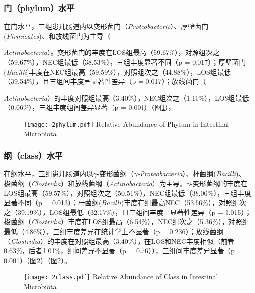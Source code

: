     \subsubsection{门（phylum）水平}
    在门水平，三组患儿肠道内以变形菌门（\textit{Proteobacteria}）、厚壁菌门(\textit{Firmicutes})、和放线菌门为主导（{\textit{Actinobacteria}）。变形菌门的丰度在LOS组最高（59.67\%），对照组次之（59.67\%），NEC组最低（38.53\%），三组丰度显著不同（p = 0.017）；厚壁菌门(\textit{Bacilli})丰度在NEC组最高（59.59\%），对照组次之（44.88\%），LOS组最低（39.54\%），且三组间丰度呈显著性差异（p = 0.017）；放线菌门（{\textit{Actinobacteria}）的丰度对照组最高（3.40\%），NEC组次之（1.10\%），LOS组最低（0.06\%），三组丰度组间差异显著（p = 0.001）（图\ref{fig:2phylum}）。
      \begin{figure}[!htp]
        \centering
        \texttt{[image: 2phylum.pdf]}
          {Relative Abundance of Phylum in Intestinal Microbiota.}
        \label{fig:2phylum}
      \end{figure}

    \subsubsection{纲（class）水平}
    在纲水平，三组患儿肠道内以$\gamma$-变形菌纲（\textit{$\gamma$-Proteobacteria}）、杆菌纲(\textit{Bacilli})、梭菌纲（\textit{Clostridia}）和放线菌纲（\textit{Actinobacteria}）为主导。$\gamma$-变形菌纲的丰度在LOS组最高（59.57\%），对照组次之（50.51\%），NEC组最低（38.06\%），三组丰度显著不同（p = 0.013）；杆菌纲(\textit{Bacilli})丰度在组最高NEC（53.56\%），对照组次之（39.19\%），LOS组最低（32.17\%），且三组间丰度呈显著性差异（p = 0.015）；梭菌纲（\textit{Clostridia}）丰度在LOS组最高（6.54\%），NEC组次之（5.36\%），对照组最低（4.86\%），三组丰度差异在统计学上不显著（p = 0.236）；放线菌纲（\textit{Clostridia}）的丰度在对照组最高（3.40\%），在LOS和NEC丰度相似（前者0.63\%，后者1.01\%，组间差异不显著（p = 0.76）），三组间丰度差异显著（p = 0.001）（图\ref{fig:2class}）（图\ref{fig:2class}）。
      \begin{figure}[!htp]
        \centering
        \texttt{[image: 2class.pdf]}
          {Relative Abundance of Class in Intestinal Microbiota.}
        \label{fig:2class}
      \end{figure}

}}
